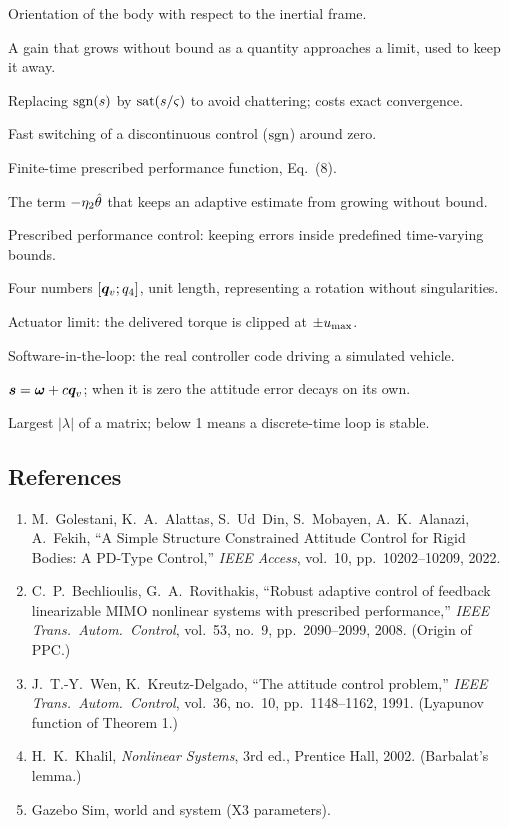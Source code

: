 \begin{description}[leftmargin=2.6cm, style=nextline, itemsep=3pt]
  \item[Attitude] Orientation of the body with respect to the inertial frame.
  \item[Barrier function] A gain that grows without bound as a quantity approaches a limit, used to keep it away.
  \item[Boundary layer] Replacing $\operatorname{sgn}(s)$ by $\operatorname{sat}(s/\varsigma)$ to avoid chattering; costs exact convergence.
  \item[Chattering] Fast switching of a discontinuous control ($\operatorname{sgn}$) around zero.
  \item[FTPPF] Finite-time prescribed performance function, Eq.~(8).
  \item[Leakage] The term $-\eta_2\hat{\theta}$ that keeps an adaptive estimate from growing without bound.
  \item[PPC] Prescribed performance control: keeping errors inside predefined time-varying bounds.
  \item[Quaternion] Four numbers $[\bm{q}_v;q_4]$, unit length, representing a rotation without singularities.
  \item[Saturation] Actuator limit: the delivered torque is clipped at $\pm u_{\max}$.
  \item[SIL] Software-in-the-loop: the real controller code driving a simulated vehicle.
  \item[Sliding variable] $\bm{s}=\bm{\omega}+c\bm{q}_v$; when it is zero the attitude error decays on its own.
  \item[Spectral radius] Largest $|\lambda|$ of a matrix; below 1 means a discrete-time loop is stable.
\end{description}

\subsection{References}
\begin{enumerate}[leftmargin=*]
  \item M.~Golestani, K.~A.~Alattas, S.~Ud~Din, S.~Mobayen, A.~K.~Alanazi, A.~Fekih, ``A Simple Structure Constrained Attitude
        Control for Rigid Bodies: A PD-Type Control,'' \emph{IEEE Access}, vol.~10, pp.~10202--10209, 2022.
  \item C.~P.~Bechlioulis, G.~A.~Rovithakis, ``Robust adaptive control of feedback linearizable MIMO nonlinear systems with
        prescribed performance,'' \emph{IEEE Trans.\ Autom.\ Control}, vol.~53, no.~9, pp.~2090--2099, 2008. (Origin of PPC.)
  \item J.~T.-Y.~Wen, K.~Kreutz-Delgado, ``The attitude control problem,'' \emph{IEEE Trans.\ Autom.\ Control}, vol.~36,
        no.~10, pp.~1148--1162, 1991. (Lyapunov function of Theorem 1.)
  \item H.~K.~Khalil, \emph{Nonlinear Systems}, 3rd ed., Prentice Hall, 2002. (Barbalat's lemma.)
  \item Gazebo Sim,  world and  system (X3 parameters).
\end{enumerate}
